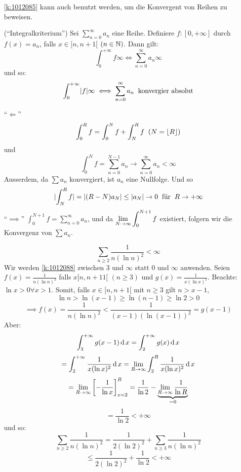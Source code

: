 \begin{Bem}\ref{k:1012085} kann auch benutzt werden, um die Konvergent von Reihen zu beweisen.
\end{Bem}
\begin{Kor}{(``Integralkriterium'')}\label{k:1012088} Sei $\sum^\infty_{n=0} a_n$ eine Reihe. Definiere $f:[0,+\infty]$ durch $f(x)=a_n$, falls $x\in[n,n+1[$ $(n\in \mathbb{N})$. Dann gilt:
  \[\int_0^{+\infty}f\infty\iff \sum_{n=0}^\infty a_n\infty\]
  und so:
  \[\int_0^{+\infty}\mathopen| f \mathclose|\infty\iff \sum_{n=0}^\infty a_n\hspace{2mm}\text{konvergier absolut}\]
\end{Kor}
\begin{Bew}
  ``$\Leftarrow$''
  \[\int_0^Rf=\int_0^Nf+\int_N^Rf\hspace{2mm}(N=\left\lfloor R \right\rfloor)\]
  und
  \[\int_0^N f=\sum_{n=0}^{N-1}a_n\rightarrow\sum^\infty_{n=0}a_n<\infty\]
  Ausserdem, da $\sum a_n$ konvergiert, ist $a_n$ eine Nullfolge. Und so
  \[\mathopen| \int_N^Rf \mathclose|=\mathopen| (R-N)a_N \mathclose|\leq\mathopen| a_N \mathclose|\rightarrow 0\hspace{2mm}\text{für}\hspace{2mm} R\to +\infty\]
  ``$\implies$'' $\int_0^{N+1}f=\sum^\infty_{n=0}a_n$, und da $\displaystyle\lim_{N\rightarrow\infty}\int_0^{N+1}f$ existiert, folgern wir die Konvergenz von $\sum a_n$.
\end{Bew}
\begin{Bsp}
  \[\sum_{n\geq 2}\frac{1}{n(\ln n)^2}<\infty\]
  Wir werden \ref{k:1012088} zwischen 3 und $\infty$ statt $0$ und $\infty$ anwenden. Seien $f(x)=\frac{1}{n(\ln n)^2}$ falls $x[n,n+11[$ $(n\geq 3)$ und $g(x)=\frac{1}{x(\ln x)^2}$. Beachte: $\ln x>0 \forall x>1$. Somit, falls $x\in[n,n+1[$ mit $n\geq 3$ gilt $n>x-1$,
  \[\ln n>\ln(x-1)\geq \ln(n-1)\geq\ln 2>0\]
  \[\implies f(x)=\frac{1}{n(\ln n)^2}<\frac{1}{(x-1)(\ln(x-1))^2}=g(x-1)\]
  Aber:
  \[\int_3^{+\infty}g(x-1)\operatorname{d} x=\int_2^{+\infty}g(x)\operatorname{d} x\]
  \[=\int_2^{+\infty}\frac{1}{x(\ln x)^2}\operatorname{d} x=\displaystyle\lim_{R\rightarrow\infty}\int_2^R\frac{1}{x(\ln x)^2}\operatorname{d} x\]
  \[=\displaystyle\lim_{R\rightarrow\infty}\left[ -\frac{1}{\ln x} \right]^R_{x=2}=\frac{1}{\ln 2}-\underbrace{\displaystyle\lim_{R\rightarrow\infty}\frac{1}{\ln R}}_{=0}\]
  \[=\frac{1}{\ln 2}< +\infty\]
  und so:
  \[\sum_{n\geq 2}\frac{1}{n(\ln n)^2}=\frac{1}{2(\ln 2)^2}+\sum_{n\geq 3}\frac{1}{n(\ln n)^2}\]
  \[\leq\frac{1}{2(\ln 2)^2}+\frac{1}{\ln 2}< +\infty\]
\end{Bsp}
